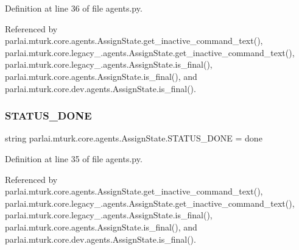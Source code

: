 Definition at line 36 of file agents.\+py.



Referenced by parlai.\+mturk.\+core.\+agents.\+Assign\+State.\+get\+\_\+inactive\+\_\+command\+\_\+text(), parlai.\+mturk.\+core.\+legacy\+\_.\+agents.\+Assign\+State.\+get\+\_\+inactive\+\_\+command\+\_\+text(), parlai.\+mturk.\+core.\+legacy\+\_.\+agents.\+Assign\+State.\+is\+\_\+final(), parlai.\+mturk.\+core.\+agents.\+Assign\+State.\+is\+\_\+final(), and parlai.\+mturk.\+core.\+dev.\+agents.\+Assign\+State.\+is\+\_\+final().

\mbox{\label{classparlai_1_1mturk_1_1core_1_1agents_1_1AssignState_a13ac505cad1e67ccaee03cde2a98841f}} 
\subsubsection{\texorpdfstring{S\+T\+A\+T\+U\+S\+\_\+\+D\+O\+NE}{STATUS\_DONE}}
{\footnotesize\ttfamily string parlai.\+mturk.\+core.\+agents.\+Assign\+State.\+S\+T\+A\+T\+U\+S\+\_\+\+D\+O\+NE = \textquotesingle{}done\textquotesingle{}\hspace{0.3cm}{\ttfamily [static]}}



Definition at line 35 of file agents.\+py.



Referenced by parlai.\+mturk.\+core.\+agents.\+Assign\+State.\+get\+\_\+inactive\+\_\+command\+\_\+text(), parlai.\+mturk.\+core.\+legacy\+\_.\+agents.\+Assign\+State.\+get\+\_\+inactive\+\_\+command\+\_\+text(), parlai.\+mturk.\+core.\+legacy\+\_.\+agents.\+Assign\+State.\+is\+\_\+final(), parlai.\+mturk.\+core.\+agents.\+Assign\+State.\+is\+\_\+final(), and parlai.\+mturk.\+core.\+dev.\+agents.\+Assign\+State.\+is\+\_\+final().

\mbox{\label{classparlai_1_1mturk_1_1core_1_1agents_1_1AssignState_ab6e92544f1357440c879cda2a2df9b82}} 
